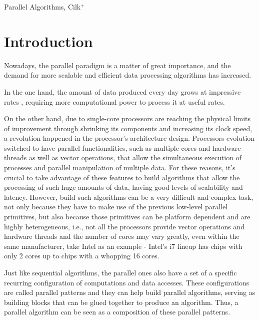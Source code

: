 \documentclass[conference,compsoc]{IEEEtran}
\begin{document}
\begin{abstract}
\end{abstract}

\IEEEpeerreviewmaketitle

\begin{IEEEkeywords}
Parallel Algorithms, Cilk$^+$
\end{IEEEkeywords}%


\section{Introduction}

Nowadays, the parallel paradigm is a matter of great importance, and the demand for more scalable and efficient data processing algorithms has increased.

In the one hand, the amount of data produced every day grows at impressive rates \cite{mcafee2012big}, requiring more computational power to process it at useful rates.

On the other hand, due to single-core processors are reaching the physical limits of improvement through shrinking its components and increasing its clock speed, a revolution happened in the processor's architecture design. Processors evolution switched to have parallel functionalities, such as multiple cores and hardware threads as well as vector operations, that allow the simultaneous execution of processes and parallel manipulation of multiple data.
For these reasons, it's crucial to take advantage of these features to build algorithms that allow the processing of such huge amounts of data, having good levels of scalability and latency. However, build such algorithms can be a very difficult and complex task, not only because they have to make use of the previous low-level parallel primitives,
but also because those primitives can be platform dependent and are highly heterogeneous, i.e., not all the processors provide vector operations and hardware threads and the number of cores may vary greatly, even within the same manufacturer, take Intel as an example - Intel's i7 lineup has chips with only 2 cores up to chips with a whopping 16 cores.

Just like sequential algorithms, the parallel ones also have a set of a specific recurring configuration of computations and data accesses. These configurations are called parallel patterns \cite{mccool2010structured} and they can help build parallel algorithms, serving as building blocks that can be glued together to produce an algorithm. Thus, a parallel algorithm can be seen as a composition of these parallel patterns.
\end{document}
